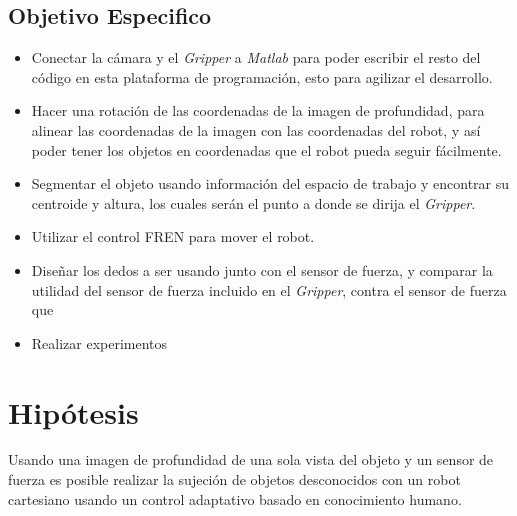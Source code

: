 \subsection{Objetivo Especifico}
\begin{itemize}
	 

\item Conectar la cámara y el \textit{Gripper} a \textit{Matlab} para poder escribir el resto del código en esta plataforma de programación, esto para agilizar el desarrollo.

\item Hacer una rotación de las coordenadas de la imagen de profundidad, para alinear las coordenadas de la imagen con las coordenadas del robot, y así poder tener los objetos en coordenadas que el robot pueda seguir fácilmente.

\item Segmentar el objeto usando información del espacio de trabajo y encontrar su centroide y altura, los cuales serán el punto a donde se dirija el \textit{Gripper}.

\item Utilizar el control FREN para mover el robot.

\item Diseñar los dedos a ser usando junto con el sensor de fuerza, y comparar la utilidad del sensor de fuerza incluido en el \textit{Gripper}, contra el sensor de fuerza que 

\item Realizar experimentos

\end{itemize}





\section{Hipótesis}
Usando una imagen de profundidad de una sola vista del objeto y un sensor de fuerza es posible realizar la sujeción de objetos desconocidos con un robot cartesiano usando un control adaptativo basado en conocimiento humano.

